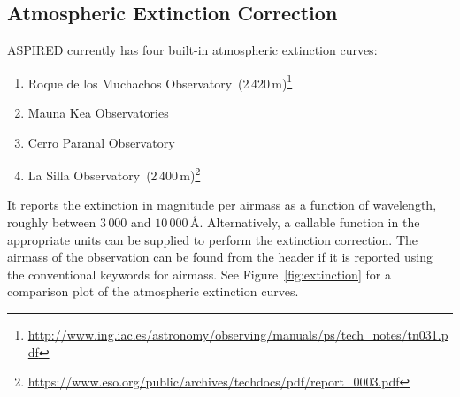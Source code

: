 \documentclass[twocolumn, linenumbers]{aastex631}
\begin{document}
\subsection{Atmospheric Extinction Correction}
\textsc{ASPIRED} currently has four built-in atmospheric extinction curves:

\begin{enumerate}
    \item Roque de los Muchachos Observatory~(2\,420\,m)\footnote{\url{http://www.ing.iac.es/astronomy/observing/manuals/ps/tech\_notes/tn031.pdf}}
    \item Mauna Kea Observatories~\citep[4\,205\,m;][]{2013A&A...549A...8B}
    \item Cerro Paranal Observatory~\citep[2\,635\,m;][]{2011A&A...527A..91P}
    \item La Silla Observatory~(2\,400\,m)\footnote{\url{https://www.eso.org/public/archives/techdocs/pdf/report\_0003.pdf}}
\end{enumerate}

It reports the extinction in magnitude per airmass as a function of wavelength,
roughly between $3\,000$ and $10\,000$\,\AA. Alternatively, a callable function
in the appropriate units can be supplied to perform the extinction correction.
The airmass of the observation can be found from the header if it is reported
using the conventional keywords for airmass. See Figure~\ref{fig:extinction}
for a comparison plot of the atmospheric extinction curves.
\end{document}
